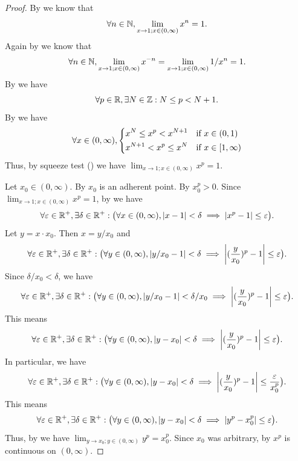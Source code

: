 \begin{proof}
  By  we know that
  \[
    \forall n \in \mathbb{N}, \lim_{x \to 1 ; x \in (0, \infty)} x^n = 1.
  \]
  Again by  we know that
  \[
    \forall n \in \mathbb{N}, \lim_{x \to 1 ; x \in (0, \infty)} x^{-n} = \lim_{x \to 1 ; x \in (0, \infty)} 1 / x^n = 1.
  \]
  By  we have
  \[
    \forall p \in \mathbb{R}, \exists N \in \mathbb{Z} : N \leq p < N + 1.
  \]
  By  we have
  \[
    \forall x \in (0, \infty), \begin{dcases}
      x^N \leq x^p < x^{N + 1}   & \text{if } x \in (0, 1)      \\
      x^{N + 1} < x^p \leq x^{N} & \text{if } x \in [1, \infty)
    \end{dcases}
  \]
  Thus, by squeeze test () we have \(\lim_{x \to 1 ; x \in (0, \infty)} x^p = 1\).

  Let \(x_0 \in (0, \infty)\).
  By  \(x_0\) is an adherent point.
  By  \(x_0^p > 0\).
  Since \(\lim_{x \to 1 ; x \in (0, \infty)} x^p = 1\), by  we have
  \[
    \forall \varepsilon \in \mathbb{R}^+, \exists \delta \in \mathbb{R}^+ : \big(\forall x \in (0, \infty), \left\lvert x - 1\right\rvert < \delta \implies \left\lvert x^p - 1\right\rvert \leq \varepsilon\big).
  \]
  Let \(y = x \cdot x_0\).
  Then \(x = y / x_0\) and
  \[
    \forall \varepsilon \in \mathbb{R}^+, \exists \delta \in \mathbb{R}^+ : \big(\forall y \in (0, \infty), \left\lvert y / x_0 - 1\right\rvert < \delta \implies \left\lvert(\dfrac{y}{x_0})^p - 1\right\rvert \leq \varepsilon\big).
  \]
  Since \(\delta / x_0 < \delta\), we have
  \[
    \forall \varepsilon \in \mathbb{R}^+, \exists \delta \in \mathbb{R}^+ : \big(\forall y \in (0, \infty), \left\lvert y / x_0 - 1\right\rvert < \delta / x_0 \implies \left\lvert(\dfrac{y}{x_0})^p - 1\right\rvert \leq \varepsilon\big).
  \]
  This means
  \[
    \forall \varepsilon \in \mathbb{R}^+, \exists \delta \in \mathbb{R}^+ : \big(\forall y \in (0, \infty), \left\lvert y - x_0\right\rvert < \delta \implies \left\lvert(\dfrac{y}{x_0})^p - 1\right\rvert \leq \varepsilon\big).
  \]
  In particular, we have
  \[
    \forall \varepsilon \in \mathbb{R}^+, \exists \delta \in \mathbb{R}^+ : \big(\forall y \in (0, \infty), \left\lvert y - x_0\right\rvert < \delta \implies \left\lvert(\dfrac{y}{x_0})^p - 1\right\rvert \leq \dfrac{\varepsilon}{x_0^p}\big).
  \]
  This means
  \[
    \forall \varepsilon \in \mathbb{R}^+, \exists \delta \in \mathbb{R}^+ : \big(\forall y \in (0, \infty), \left\lvert y - x_0\right\rvert < \delta \implies \left\lvert y^p - x_0^p\right\rvert \leq \varepsilon\big).
  \]
  Thus, by  we have \(\lim_{y \to x_0 ; y \in (0, \infty)} y^p = x_0^p\).
  Since \(x_0\) was arbitrary, by  \(x^p\) is continuous on \((0, \infty)\).
\end{proof}

